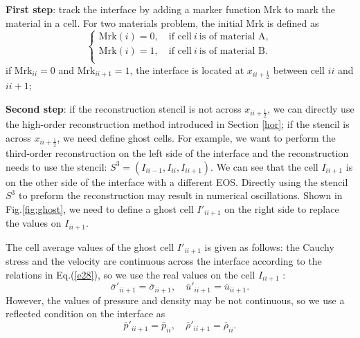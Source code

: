 \documentclass[review]{elsarticle}
\begin{document}
\textbf{First step}: track the interface  by adding  a marker function $\text{Mrk}$  to mark the material in a cell. For two materials problem, the initial $\text{Mrk}$ is defined as
\begin{equation}
  \left\{
  \begin{aligned}
    \text{Mrk}(i) = 0 ,\quad \text{if cell} \ i \ \text{is of  material A}, \\
    \text{Mrk}(i) = 1 ,\quad \text{if cell} \ i \ \text{is  of material B}. \\
\end{aligned}
\right.
\end{equation}
if $\text{Mrk}_{ii} = 0$ and   $\text{Mrk}_{ii+1} = 1$, the interface is located at $x_{ii+\frac{1}{2}}$ between cell $ii$ and $ii+1$;

\textbf{Second  step}: if the reconstruction stencil is not across $x_{ii+\frac{1}{2}}$, we can directly use the high-order reconstruction method introduced in  Section \ref{hor}; if the stencil is across $x_{ii+\frac{1}{2}}$, we need define ghost cells. For example, we want to perform the third-order reconstruction on  the  left side of the interface and the reconstruction needs to use  the stencil: $S^3=(I_{ii-1},I_{ii}, I_{ii+1})$. We can see that  the cell $I_{ii+1}$ is  on the other side of the interface with a different EOS. Directly using the  stencil $S^3$ to preform the reconstruction may result in numerical oscillations.
Shown in Fig.\ref{fig:ghost}, we need to define   a  ghost cell $I'_{ii+1}$ on the right side to replace  the values on $I_{ii+1}$.


The cell average values of the ghost cell $I'_{ii+1}$ is  given as follows: the Cauchy stress and the velocity  are  continuous across the interface according to the relations in Eq.(\ref{e28}), so we use the real values on  the cell $I_{ii+1}$ :
\begin{equation}
  \overline{\sigma}'_{ii+1} = \overline{\sigma}_{ii+1}, \quad \overline{u}'_{ii+1} = \overline{u}_{ii+1}.
\end{equation}
However, the values of pressure and density may be not continuous, so we use a reflected condition on the interface as
\begin{equation}
\overline{p}'_{ii+1} = \overline{p}_{ii}, \quad \overline{\rho}'_{ii+1} = \overline{\rho}_{ii}.
\end{equation}
\end{document}
